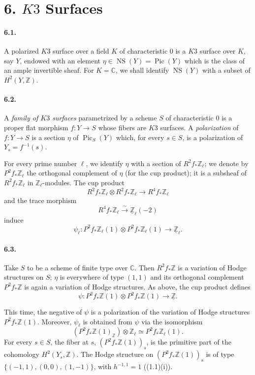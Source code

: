 \documentclass[10pt,leqno]{article}
\newcommand{\C}{\mathbb{C}}
\newcommand{\Z}{\mathbb{Z}}
\newcommand{\Pic}{\operatorname{Pic}}
\providecommand{\NS}{\operatorname{NS}}
\begin{document}
\section*{6. $K3$ Surfaces}

\paragraph{6.1.} A polarized $K3$ surface over a field $K$ of characteristic $0$ is a $K3$ surface over $K$, say $Y$, endowed with an element $\eta\in\NS(Y)=\Pic(Y)$ which is the class of an ample invertible sheaf. For $K=\C$, we shall identify $\NS(Y)$ with a subset of $H^2(Y,\Z)$.

\paragraph{6.2.} A \emph{family of $K3$ surfaces} parametrized by a scheme $S$ of characteristic $0$ is a proper flat morphism $f:Y\to S$ whose fibers are $K3$ surfaces. A \emph{polarization} of $f:Y\to S$ is a section $\eta$ of $\Pic_S(Y)$ which, for every $s\in S$, is a polarization of $Y_s=f^{-1}(s)$.

For every prime number $\ell$, we identify $\eta$ with a section of $R^2f_*\Z_\ell$; we denote by $P^2f_*\Z_\ell$ the orthogonal complement of $\eta$ (for the cup product); it is a subsheaf of $R^2f_*\Z_\ell$ in $\Z_\ell$-modules. The cup product
\[
R^2f_*\Z_\ell\otimes R^2f_*\Z_\ell\longrightarrow R^4f_*\Z_\ell
\]
and the trace morphism
\[
R^4f_*\Z_\ell\xrightarrow{\sim}\underline{\Z}_\ell(-2)
\]
induce
\[
\tag{6.2.1}
\psi_\ell:P^2f_*\Z_\ell(1)\otimes P^2f_*\Z_\ell(1)\longrightarrow\underline{\Z}_\ell.
\]

\paragraph{6.3.} Take $S$ to be a scheme of finite type over $\C$. Then $R^2f_*\Z$ is a variation of Hodge structures on $S$; $\eta$ is everywhere of type $(1,1)$ and its orthogonal complement $P^2f_*\Z$ is again a variation of Hodge structures. As above, the cup product defines
\[
\tag{6.3.1}
\psi:P^2f_*\Z(1)\otimes P^2f_*\Z(1)\longrightarrow\underline{\Z}.
\]

\clearpage

This time, the negative of $\psi$ is a polarization of the variation of Hodge structures $P^2f_*\Z(1)$. Moreover, $\psi_\ell$ is obtained from $\psi$ via the isomorphism
\[
(P^2f_*\Z(1)_\Z)\otimes\Z_\ell\simeq P^2f_*\Z_\ell(1).
\]
For every $s\in S$, the fiber at $s$, $(P^2f_*\Z(1))_s$, is the primitive part of the cohomology $H^2(Y_s,\Z)$. The Hodge structure on $(P^2f_*\Z(1))_s$ is of type $\{(-1,1),(0,0),(1,-1)\}$, with $h^{-1,1}=1$ ((1.1)(i)).
\end{document}
